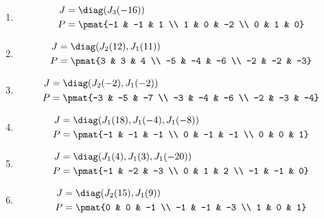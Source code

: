 \begin{enumerate}
\item

\begin{align*}
J &= \diag(J_{3}(-16))\\
P &= \pmat{-1 & -1 & 1 \\ 1 & 0 & -2 \\ 0 & 1 & 0}
\end{align*}

\item

\begin{align*}
J &= \diag(J_{2}(12), J_{1}(11))\\
P &= \pmat{3 & 3 & 4 \\ -5 & -4 & -6 \\ -2 & -2 & -3}
\end{align*}

\item

\begin{align*}
J &= \diag(J_{2}(-2), J_{1}(-2))\\
P &= \pmat{-3 & -5 & -7 \\ -3 & -4 & -6 \\ -2 & -3 & -4}
\end{align*}

\item

\begin{align*}
J &= \diag(J_{1}(18), J_{1}(-4), J_{1}(-8))\\
P &= \pmat{-1 & -1 & -1 \\ 0 & -1 & -1 \\ 0 & 0 & 1}
\end{align*}

\item

\begin{align*}
J &= \diag(J_{1}(4), J_{1}(3), J_{1}(-20))\\
P &= \pmat{-1 & -2 & -3 \\ 0 & 1 & 2 \\ -1 & -1 & 0}
\end{align*}

\item

\begin{align*}
J &= \diag(J_{2}(15), J_{1}(9))\\
P &= \pmat{0 & 0 & -1 \\ -1 & -1 & -3 \\ 1 & 0 & 1}
\end{align*}


\end{enumerate}
